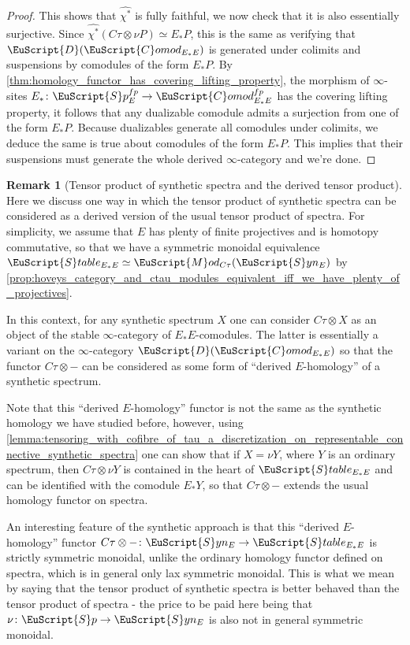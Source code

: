 \documentclass[oneside,a4paper]{amsart}
\newcommand{\euscr}[1]{\EuScript{#1}} %
\newcommand{\dcat}{\euscr{D}} %
\newcommand{\spectra}{\euscr{S}p} %
\newcommand{\stableE}{\euscr{S}table_{E_{*}E}} %
\newcommand{\synspectra}{\euscr{S}yn} %
\newcommand{\Comod}{\euscr{C}omod} %
\newcommand{\ComodE}{\Comod_{E_{*}E}} %
\newcommand{\Mod}{\euscr{M}od} %
\theoremstyle{plain}
\theoremstyle{definition}
\newtheorem{rem}[thm]{Remark}
\theoremstyle{remark}
\begin{document}
\begin{proof}
This shows that $\widehat{\chi^{*}}$ is fully faithful, we now check that it is also essentially surjective. Since $\widehat{\chi^{*}} (C \tau \otimes \nu P) \simeq E_{*}P$, this is the same as verifying that $\dcat(\ComodE)$ is generated under colimits and suspensions by comodules of the form $E_{*}P$. By \cref{thm:homology_functor_has_covering_lifting_property}, the morphism of $\infty$-sites $E_{*} \colon \spectra_{E}^{fp} \rightarrow \ComodE^{fp}$ has the covering lifting property, it follows that any dualizable comodule admits a surjection from one of the form $E_{*}P$. Because dualizables generate all comodules under colimits, we deduce the same is true about comodules of the form $E_{*}P$. This implies that their suspensions must generate the whole derived $\infty$-category and we're done. 
\end{proof}

\begin{rem}[Tensor product of synthetic spectra and the derived tensor product]
Here we discuss one way in which the tensor product of synthetic spectra can be considered as a derived version of the usual tensor product of spectra. For simplicity, we assume that $E$ has plenty of finite projectives and is homotopy commutative, so that we have a symmetric monoidal equivalence $\stableE \simeq \Mod_{C\tau}(\synspectra_{E})$ by \cref{prop:hoveys_category_and_ctau_modules_equivalent_iff_we_have_plenty_of_projectives}.

In this context, for any synthetic spectrum $X$ one can consider $C \tau \otimes X$ as an object of the stable $\infty$-category of $E_{*}E$-comodules. The latter is essentially a variant on the $\infty$-category $\dcat(\ComodE)$ so that the functor $C\tau \otimes -$ can be considered as some form of ``derived $E$-homology'' of a synthetic spectrum. 

Note that this ``derived $E$-homology'' functor is not the same as the synthetic homology we have studied before, however, using \cref{lemma:tensoring_with_cofibre_of_tau_a_discretization_on_representable_connective_synthetic_spectra} one can show that if $X = \nu Y$, where $Y$ is an ordinary spectrum, then $C\tau \otimes \nu Y$ is contained in the heart of $\stableE$ and can be identified with the comodule $E_{*}Y$, so that $C\tau \otimes -$ extends the usual homology functor on spectra. 

An interesting feature of the synthetic approach is that this ``derived $E$-homology'' functor $C\tau \otimes - \colon \synspectra_{E} \rightarrow \stableE$ is strictly symmetric monoidal, unlike the ordinary homology functor defined on spectra, which is in general only lax symmetric monoidal. This is what we mean by saying that the tensor product of synthetic spectra is better behaved than the tensor product of spectra - the price to be paid here being that $\nu \colon \spectra \rightarrow \synspectra_{E}$ is also not in general symmetric monoidal. 
\end{rem}
\end{document}
